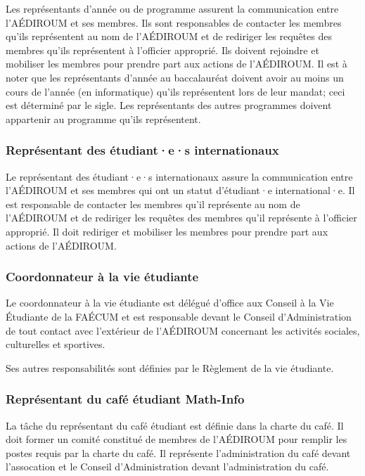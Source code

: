 \documentclass{aediroum}
\begin{document}
Les représentants d'année ou de programme assurent la communication entre l'AÉDIROUM et ses membres. Ils sont responsables de contacter les membres qu'ils représentent au nom de l'AÉDIROUM et de rediriger les requêtes des membres qu'ils représentent à l'officier approprié. Ils doivent rejoindre et mobiliser les membres pour prendre part aux actions de l'AÉDIROUM. Il est à noter que les représentants d'année au baccalauréat doivent avoir au moins un cours de l'année (en informatique) qu'ils représentent lors de leur mandat; ceci est déterminé par le sigle. Les représentants des autres programmes doivent appartenir au programme qu'ils représentent.

\subsubsection{Représentant des étudiant·e·s internationaux}\label{sec:representant-des-etudiants-internationaux}

Le représentant des étudiant·e·s internationaux assure la communication entre l'AÉDIROUM et ses membres qui ont un statut d'étudiant·e international·e. Il est responsable de contacter les membres qu'il représente au nom de l'AÉDIROUM et de rediriger les requêtes des membres qu'il représente à l'officier approprié. Il doit rediriger et mobiliser les membres pour prendre part aux actions de l'AÉDIROUM.

\subsubsection{Coordonnateur à la vie étudiante}\label{sec:coordonnateur-a-la-vie-etudiante}

Le coordonnateur à la vie étudiante est délégué d'office aux Conseil à la Vie Étudiante de la FAÉCUM et est responsable devant le Conseil d'Administration de tout contact avec l'extérieur de l'AÉDIROUM concernant les activités sociales, culturelles et sportives.

Ses autres responsabilités sont définies par le Règlement de la vie étudiante.

\subsubsection{Représentant du café étudiant Math-Info}\label{sec:representant-du-cafe-etudiant-math-info}

La tâche du représentant du café étudiant est définie dans la charte du café. Il doit former un comité constitué de membres de l'AÉDIROUM pour remplir les postes requis par la charte du café. Il représente l'administration du café devant l'assocation et le Conseil d'Administration devant l'administration du café.
\end{document}

